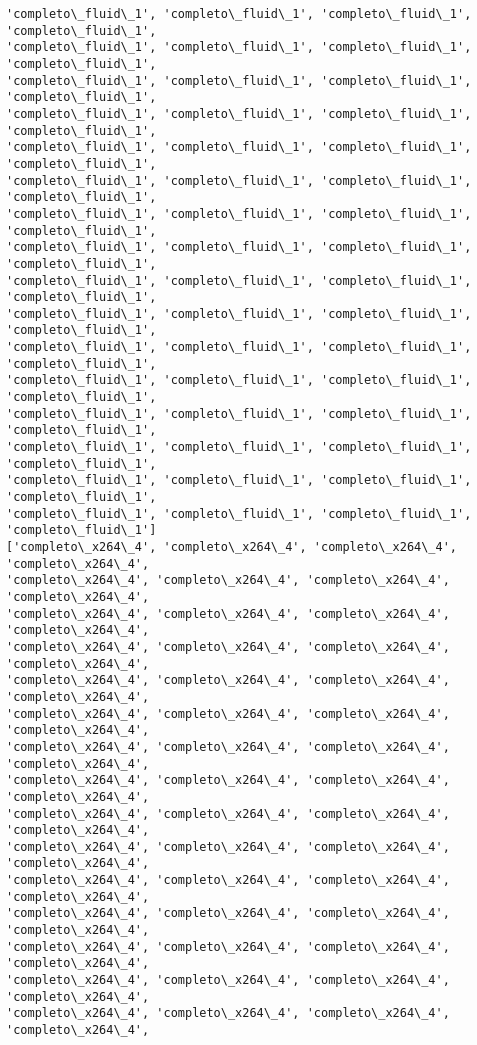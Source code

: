 \documentclass[11pt]{article}
\begin{document}
\begin{Verbatim}[commandchars=\\\{\}]
'completo\_fluid\_1', 'completo\_fluid\_1', 'completo\_fluid\_1', 'completo\_fluid\_1',
'completo\_fluid\_1', 'completo\_fluid\_1', 'completo\_fluid\_1', 'completo\_fluid\_1',
'completo\_fluid\_1', 'completo\_fluid\_1', 'completo\_fluid\_1', 'completo\_fluid\_1',
'completo\_fluid\_1', 'completo\_fluid\_1', 'completo\_fluid\_1', 'completo\_fluid\_1',
'completo\_fluid\_1', 'completo\_fluid\_1', 'completo\_fluid\_1', 'completo\_fluid\_1',
'completo\_fluid\_1', 'completo\_fluid\_1', 'completo\_fluid\_1', 'completo\_fluid\_1',
'completo\_fluid\_1', 'completo\_fluid\_1', 'completo\_fluid\_1', 'completo\_fluid\_1',
'completo\_fluid\_1', 'completo\_fluid\_1', 'completo\_fluid\_1', 'completo\_fluid\_1',
'completo\_fluid\_1', 'completo\_fluid\_1', 'completo\_fluid\_1', 'completo\_fluid\_1',
'completo\_fluid\_1', 'completo\_fluid\_1', 'completo\_fluid\_1', 'completo\_fluid\_1',
'completo\_fluid\_1', 'completo\_fluid\_1', 'completo\_fluid\_1', 'completo\_fluid\_1',
'completo\_fluid\_1', 'completo\_fluid\_1', 'completo\_fluid\_1', 'completo\_fluid\_1',
'completo\_fluid\_1', 'completo\_fluid\_1', 'completo\_fluid\_1', 'completo\_fluid\_1',
'completo\_fluid\_1', 'completo\_fluid\_1', 'completo\_fluid\_1', 'completo\_fluid\_1',
'completo\_fluid\_1', 'completo\_fluid\_1', 'completo\_fluid\_1', 'completo\_fluid\_1',
'completo\_fluid\_1', 'completo\_fluid\_1', 'completo\_fluid\_1', 'completo\_fluid\_1']
['completo\_x264\_4', 'completo\_x264\_4', 'completo\_x264\_4', 'completo\_x264\_4',
'completo\_x264\_4', 'completo\_x264\_4', 'completo\_x264\_4', 'completo\_x264\_4',
'completo\_x264\_4', 'completo\_x264\_4', 'completo\_x264\_4', 'completo\_x264\_4',
'completo\_x264\_4', 'completo\_x264\_4', 'completo\_x264\_4', 'completo\_x264\_4',
'completo\_x264\_4', 'completo\_x264\_4', 'completo\_x264\_4', 'completo\_x264\_4',
'completo\_x264\_4', 'completo\_x264\_4', 'completo\_x264\_4', 'completo\_x264\_4',
'completo\_x264\_4', 'completo\_x264\_4', 'completo\_x264\_4', 'completo\_x264\_4',
'completo\_x264\_4', 'completo\_x264\_4', 'completo\_x264\_4', 'completo\_x264\_4',
'completo\_x264\_4', 'completo\_x264\_4', 'completo\_x264\_4', 'completo\_x264\_4',
'completo\_x264\_4', 'completo\_x264\_4', 'completo\_x264\_4', 'completo\_x264\_4',
'completo\_x264\_4', 'completo\_x264\_4', 'completo\_x264\_4', 'completo\_x264\_4',
'completo\_x264\_4', 'completo\_x264\_4', 'completo\_x264\_4', 'completo\_x264\_4',
'completo\_x264\_4', 'completo\_x264\_4', 'completo\_x264\_4', 'completo\_x264\_4',
'completo\_x264\_4', 'completo\_x264\_4', 'completo\_x264\_4', 'completo\_x264\_4',
'completo\_x264\_4', 'completo\_x264\_4', 'completo\_x264\_4', 'completo\_x264\_4',

\end{Verbatim}
\end{document}
